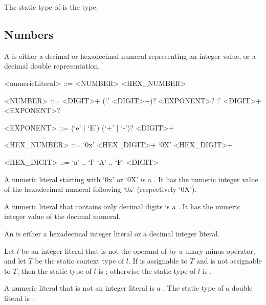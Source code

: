 \documentclass[makeidx]{article}
\begin{document}
{\LMHash{}%
The static type of \NULL{} is the  type.


\subsection{Numbers}

\LMHash{}%
A 
is either a decimal or hexadecimal numeral representing an integer value, or a decimal double representation.

\begin{grammar}
<numericLiteral> ::= <NUMBER>
  \alt <HEX\_NUMBER>

<NUMBER> ::= <DIGIT>+ (`.' <DIGIT>+)? <EXPONENT>?
  \alt `.' <DIGIT>+ <EXPONENT>?

<EXPONENT> ::= (`e' | `E') (`+' | `-')? <DIGIT>+

<HEX\_NUMBER> ::= `0x' <HEX\_DIGIT>+
  \alt `0X' <HEX\_DIGIT>+

<HEX\_DIGIT> ::= `a' .. `f'
  \alt `A' .. `F'
  \alt <DIGIT>
\end{grammar}

\LMHash{}%
A numeric literal starting with `0x' or `0X'
is a .
It has the numeric integer value of the hexadecimal numeral
following `0x' (respectively `0X').

\LMHash{}%
A numeric literal that contains only decimal digits is a
.
It has the numeric integer value of the decimal numeral.

\LMHash{}%
An 
is either a hexadecimal integer literal or a decimal integer literal.

\LMHash{}%
Let $l$ be an integer literal that is not the operand
of by a unary minus operator,
and let $T$ be the static context type of $l$.
If  is assignable to $T$ and  is not assignable to $T$,
then the static type of $l$ is ;
otherwise the static type of $l$ is .

\LMHash{}%
A numeric literal that is not an integer literal is a
.
The static type of a double literal is .

}
\end{document}
